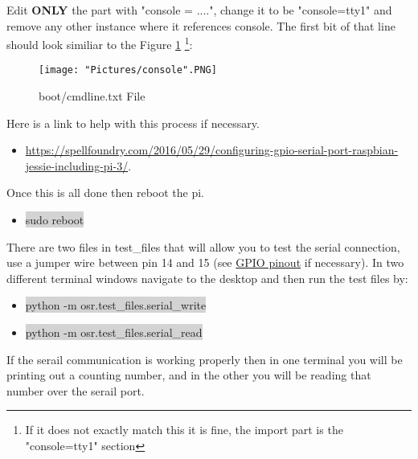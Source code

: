 \documentclass[12pt]{article}
\begin{document}
\noindent Edit \textbf{ONLY} the part with "console = ....", change it to be "console=tty1" and remove any other instance where it references console. The first bit of that line should look similiar to the Figure \ref{console} \footnote{If it does not exactly match this it is fine, the import part is the "console=tty1" section}:

\begin{figure}[H]
 	\centering
	\texttt{[image: "Pictures/console".PNG]}
 	\caption{boot/cmdline.txt File}
	\label{console}
\end{figure}

\noindent Here is a link to help with this process if necessary.
\begin{itemize}
	\item \href{https://spellfoundry.com/2016/05/29/configuring-gpio-serial-port-raspbian-jessie-including-pi-3/}{https://spellfoundry.com/2016/05/29/configuring-gpio-serial-port-raspbian-jessie-including-pi-3/}. 
\end{itemize}
\noindent Once this is all done then reboot the pi.
\begin{itemize}
	\item[] \colorbox{lightgray}{sudo reboot}
\end{itemize}

\bigskip
There are two files in test\_files that will allow you to test the serial connection, use a jumper wire between pin 14 and 15 (see \href{https://www.raspberrypi.org/documentation/usage/gpio-plus-and-raspi2/}{GPIO pinout} if necessary). In two different terminal windows navigate to the desktop and then run the test files by:
\begin{itemize}
	\item[] \colorbox{lightgray}{python -m osr.test\_files.serial\_write}  
	\item[] \colorbox{lightgray}{python -m osr.test\_files.serial\_read}
\end{itemize}

If the serail communication is working properly then in one terminal you will be printing out a counting number, and in the other you will be reading that number over the serail port. 

\newpage
\end{document}
